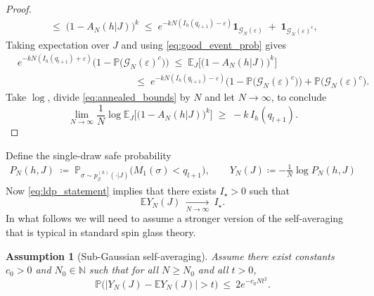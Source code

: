 \documentclass{article}
\newtheorem{assumption}[theorem]{Assumption}
\theoremstyle{remark} %
\begin{document}
\begin{proof}
\begin{align}
\;\le\;
\big(1-A_N(h \vert J)\big)^k
\;\le\;
e^{-kN(I_h(q_{l+1})-\varepsilon)}\mathbf 1_{\mathcal G_N(\varepsilon)}
\;+\;
\mathbf 1_{\mathcal G_N(\varepsilon)^c},
\end{align}
Taking expectation over $J$ and using \eqref{eq:good_event_prob} gives
\begin{equation}\label{eq:annealed_bounds}
\begin{aligned}
    & e^{-kN(I_h(q_{l+1})+\varepsilon)}\Big(1-\mathbb P \big(\mathcal G_N(\varepsilon)^c\big)\Big)
\;\le\;
\mathbb E_J\Big[\big(1-A_N(h \vert J)\big)^k\Big]\\
& \hspace{5cm}
\le\;
e^{-kN(I_h(q_{l+1})-\varepsilon)} \Big(1-\mathbb P \big(\mathcal G_N(\varepsilon)^c\big)\Big)+ \mathbb P \big(\mathcal G_N(\varepsilon)^c\big).
\end{aligned}
\end{equation}
Take $\log$, divide \eqref{eq:annealed_bounds} by $N$ and let $N\to\infty$, to conclude
\begin{equation}\label{eq:annealed_exponent_limit}
\lim_{N\to\infty}\frac{1}{N}\log
\mathbb E_J\Big[\big(1-A_N(h \vert J)\big)^k\Big]
\;\geq\;
-k\,I_h(q_{l+1}).
\end{equation}

\end{proof}


Define the single-draw safe probability
\begin{align}
P_N(h,J)\;\coloneqq\;\mathbb P_{\sigma\sim p^{(h)}_\beta(\cdot \vert J)}\big(M_1(\sigma)<q_{l+1}\big), \qquad  Y_N(J)\coloneqq -\frac1N\log P_N(h,J)
\end{align}
Now \eqref{eq:ldp_statement} implies that there exists $I_\star>0$ such that
\begin{equation}\label{eq:mean_limit}
\mathbb E Y_N(J)\ \xrightarrow[N\to\infty]{}\ I_\star.
\end{equation}
In what follows we will need to assume a stronger version of the self-averaging that is typical in standard spin glass theory.
\begin{assumption}[Sub-Gaussian self-averaging]\label{as:conc_Y}
Assume there exist constants $c_0>0$ and $N_0\in\mathbb N$ such that for all $N\ge N_0$ and all $t>0$,
\begin{equation}\label{eq:subgauss}
\mathbb P\Big(\big|Y_N(J)-\mathbb E Y_N(J)\big|>t\Big)\ \le\ 2e^{-c_0 N t^2}.
\end{equation}
\end{assumption}
\end{document}
